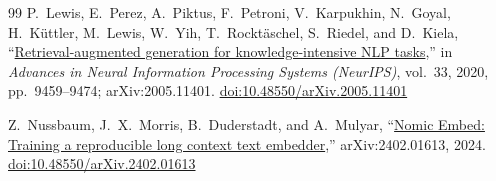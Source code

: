 \begin{thebibliography}{99}
P.~Lewis, E.~Perez, A.~Piktus, F.~Petroni, V.~Karpukhin, N.~Goyal, H.~K\"uttler, M.~Lewis, W.~Yih, T.~Rockt\"aschel, S.~Riedel, and D.~Kiela, ``\href{https://arxiv.org/abs/2005.11401}{Retrieval-augmented generation for knowledge-intensive NLP tasks},'' in \emph{Advances in Neural Information Processing Systems (NeurIPS)}, vol.~33, 2020, pp.~9459--9474; arXiv:2005.11401. \href{https://doi.org/10.48550/arXiv.2005.11401}{doi:10.48550/arXiv.2005.11401}

Z.~Nussbaum, J.~X.~Morris, B.~Duderstadt, and A.~Mulyar, ``\href{https://arxiv.org/abs/2402.01613}{Nomic Embed: Training a reproducible long context text embedder},'' arXiv:2402.01613, 2024. \href{https://doi.org/10.48550/arXiv.2402.01613}{doi:10.48550/arXiv.2402.01613}

\end{thebibliography}
